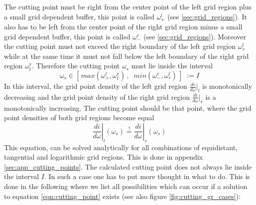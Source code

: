 The cutting point must be right from the center point of the left grid region plus a small grid dependent buffer, this point is called $\omega_+^l$ (see \ref{sec:grid_regions}). It also has to be left from the center point of the right grid region minus a small grid dependent buffer, this point is called $\omega_-^r$ (see \ref{sec:grid_regions}). Moreover the cutting point must not exceed the right boundary of the left grid region $\omega_r^l$ while at the same time it must not fall below the left boundary of the right grid region $\omega_l^r$. Therefore the cutting point $\omega_s$ must lie inside the interval
\begin{equation}\label{eqn:cutting_point_boundaries}
	\omega_s \in [\,max(\omega_+^l, \omega_l^r)\,,\;\; min(\omega_-^r, \omega_r^l)\,]\;:=I
\end{equation}
In this interval, the grid point density of the left grid region $\frac{di}{d\omega}|_l$ is monotonically decreasing and the grid point density of the right grid region $\frac{di}{d\omega}|_r$ is a monotonically increasing. The cutting point should be that point, where the grid point densities of both grid regions become equal
\begin{equation}\label{eqn:cutting_point}
	\left. \frac{di}{d\omega}\right|_l(\omega_s) \stackrel{!}{=} \left. \frac{di}{d\omega}\right|_r(\omega_s)
\end{equation}
This equation, can be solved analytically for all combinations of equidistant, tangential and logarithmic grid regions. This is done in appendix \ref{sec:app_cutting_points}. The calculated cutting point does not always lie inside the interval $I$. In such a case one has to put more thought in what to do. This is done in the following where we list all possibilities which can occur if a solution to equation \ref{eqn:cutting_point} exists (see also figure \ref{fig:cutting_gr_cases}):

